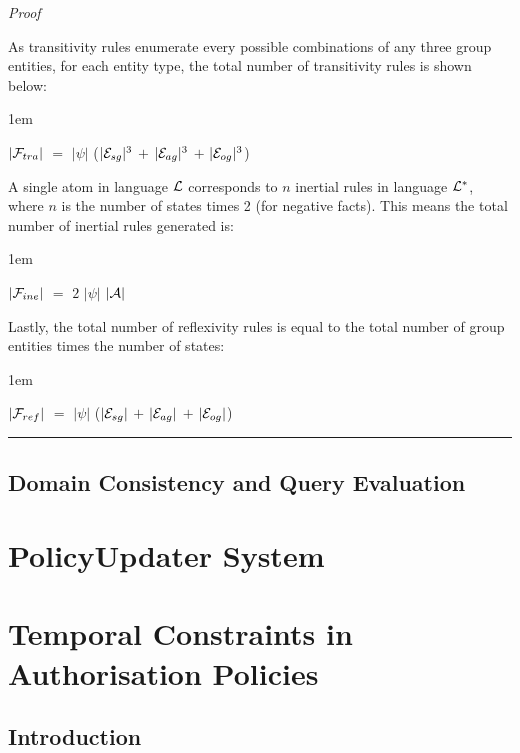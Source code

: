 \documentclass[11pt]{report}
\newenvironment{vproof}
{
  \noindent
  {\em Proof}\hspace{0.5em}
}
{

  \noindent
  \rule{0.5em}{0.5em}
}
\newenvironment{vquote}
{
  \begin{list}{}{\leftmargin 1em}\item[]
}
{
  \end{list}
}
\begin{document}
\begin{vproof}
            As transitivity rules enumerate every possible combinations of any
            three group entities, for each entity type, the total number of
            transitivity rules is shown below:
 
            \begin{vquote}
              $|{\cal F}_{tra}|$ $=$
              $|\psi|$
              ($|{\cal E}_{sg}|^{3}$ $+$ $|{\cal E}_{ag}|^{3}$ $+$ $|{\cal E}_{og}|^{3}$)
            \end{vquote}
 
            A single atom in language ${\cal L}$ corresponds to $n$ inertial
            rules in language ${\cal L}^{*}$, where $n$ is the number of states
            times 2 (for negative facts). This means the total number of
            inertial rules generated is:
 
            \begin{vquote}
              $|{\cal F}_{ine}|$ $=$ $2$ $|\psi|$ $|{\cal A}|$
            \end{vquote}
 
            Lastly, the total number of reflexivity rules is equal to the total
            number of group entities times the number of states:
 
            \begin{vquote}
              $|{\cal F}_{ref}|$ $=$
              $|\psi|$
              ($|{\cal E}_{sg}|$ $+$ $|{\cal E}_{ag}|$ $+$ $|{\cal E}_{og}|$)
            \end{vquote}
          \end{vproof}

    \section{Domain Consistency and Query Evaluation}

  \chapter{PolicyUpdater System}

  \chapter{Temporal Constraints in Authorisation Policies}

    \section{Introduction}
\end{document}
